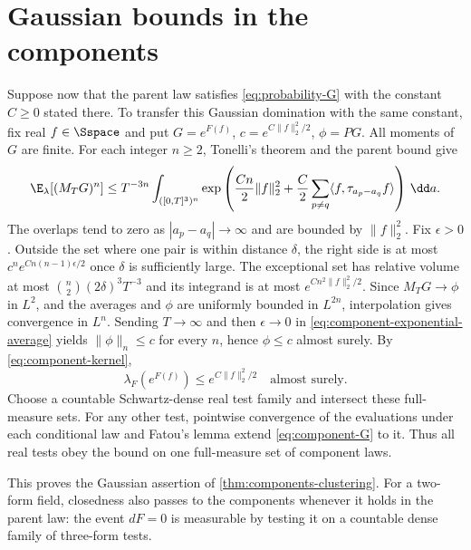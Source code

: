 \section{Gaussian bounds in the components}\label{sec:component-gaussian}
Suppose now that the parent law satisfies
\eqref{eq:probability-G} with the constant $C\ge0$ stated there. To transfer this Gaussian domination with
the same constant, fix real
$f\in\Sspace$ and put $G=e^{F(f)}$, $c=e^{C\|f\|_2^2/2}$,
$\phi=PG$. All moments of $G$ are finite. For each integer $n\ge2$,
Tonelli's theorem and the parent bound give
\begin{equation}\label{eq:component-exponential-average}
 \E_\lambda[(M_TG)^n]\le T^{-3n}
 \int_{([0,T]^3)^n}
 \exp\left(\frac {Cn}2\|f\|_2^2+
       \frac C2\sum_{p\ne q}\langle f,\tau_{a_p-a_q}f\rangle\right)\,\dd a.
\end{equation}
The overlaps tend to zero as $|a_p-a_q|\to\infty$ and are bounded
by $\|f\|_2^2$. Fix $\epsilon>0$. Outside the set where one pair is within distance
$\delta$, the right side is at most
$c^n e^{Cn(n-1)\epsilon/2}$ once $\delta$ is sufficiently large.
The exceptional set has relative volume at most
$\binom n2(2\delta)^3T^{-3}$ and its integrand is at most
$e^{Cn^2\|f\|_2^2/2}$.
Since $M_TG\to\phi$ in $L^2$, and the averages and $\phi$ are
uniformly bounded in $L^{2n}$, interpolation gives convergence in
$L^n$. Sending $T\to\infty$ and then $\epsilon\to0$ in
\eqref{eq:component-exponential-average} yields
$\|\phi\|_n\le c$ for every $n$, hence $\phi\le c$ almost surely.
By \eqref{eq:component-kernel},
\begin{equation}\label{eq:component-G}
 \lambda_F(e^{F(f)})\le e^{C\|f\|_2^2/2}\quad\text{almost surely}.
\end{equation}
Choose a countable Schwartz-dense real test family and intersect
these full-measure sets. For any other test, pointwise convergence
of the evaluations under each conditional law and Fatou's lemma
extend \eqref{eq:component-G} to it. Thus all real tests obey the
bound on one full-measure set of component laws.

This proves the Gaussian assertion of
\cref{thm:components-clustering}. For a two-form field, closedness
also passes to the components whenever it holds in the parent law:
the event $dF=0$ is measurable by testing it on a countable dense
family of three-form tests.
